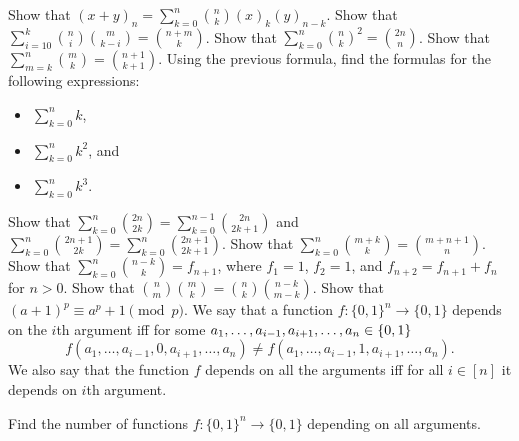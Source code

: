 \begin{exercises}
  \exercise Show that
    $(x + y)_n = \sum_{k = 0}^n \binom{n}{k} (x)_k (y)_{n - k}$.
  \exercise Show that
    $\sum_{i = 10}^k \binom{n}{i} \binom{m}{k - i} = \binom{n + m}{k}$.
  \exercise Show that
    $\sum_{k = 0}^n \binom{n}{k}^2 = \binom{2n}{n}$.
  \exercise Show that $\sum_{m = k}^n \binom{m}{k} =
    \binom{n + 1}{k + 1}$.
  \exercise Using the previous formula, find the formulas for the following
    expressions:
    \begin{itemize}
      \item $\sum_{k = 0}^n k$,
      \item $\sum_{k = 0}^n k^2$, and
      \item $\sum_{k = 0}^n k^3$.
    \end{itemize}
  \exercise Show that $\sum_{k = 0}^{n} \binom{2n}{2k} =
    \sum_{k = 0}^{n - 1} \binom{2n}{2k + 1}$ and
    $\sum_{k = 0}^{n} \binom{2n + 1}{2k} =
    \sum_{k = 0}^n \binom{2n + 1}{2k + 1}$.
  \exercise Show that $\sum_{k = 0}^n \binom{m + k}{k} =
    \binom{m + n + 1}{n}$.
  \exercise Show that $\sum_{k = 0}^n \binom{n - k}{k} = f_{n + 1}$,
    where $f_1 = 1$, $f_2 = 1$, and $f_{n + 2} = f_{n + 1} + f_n$ for $n > 0$.
  \exercise Show that $\binom{n}{m} \binom{m}{k} =
    \binom{n}{k} \binom{n - k}{m - k}$.
  \exercise Show that
    $(a + 1)^p \equiv a^p + 1 \pmod{p}$.
  \exercise We say that a function $f : \{0, 1\}^n \to \{0, 1\}$ depends on the
    $i$th argument iff for some
    $a_1, \dots, a_{i - 1}, a_{i + 1}, \dots, a_n \in \set{0, 1}$
    \[
      f(a_1, \dots, a_{i - 1}, 0, a_{i + 1}, \dots, a_n) \neq
      f(a_1, \dots, a_{i - 1}, 1, a_{i + 1}, \dots, a_n).
    \]
    We also say that the function $f$ depends on all the arguments iff for all $i
    \in [n]$ it depends on $i$th argument.

    Find the number of functions $f : \{0, 1\}^n \to \{0, 1\}$ depending on all
    arguments.
\end{exercises}

